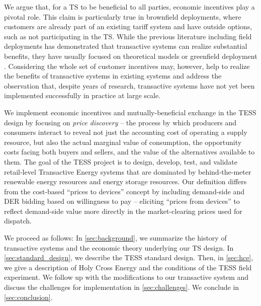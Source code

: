 We argue that, for a TS to be beneficial to all parties, economic incentives play a pivotal role. This claim is particularly true in brownfield deployments, where customers are already part of an existing tariff system and have outside options, such as not participating in the TS. While the previous literature including field deployments has demonstrated that transactive systems can realize substantial benefits, they have usually focused on theoretical models or greenfield deployment \citep[p. 12]{abrishambaf_towards_2019}. Considering the whole set of customer incentives may, however, help to realize the benefits of transactive systems in existing systems and address the observation that, despite years of research, transactive systems have not yet been implemented successfully in practice at large scale.



We implement economic incentives and mutually-beneficial exchange in the TESS design by focusing on \emph{price discovery} -- the process by which producers and consumers interact to reveal not just the accounting cost of operating a supply resource, but also the actual marginal value of consumption, the opportunity costs facing both buyers and sellers, and the value of the alternatives available to them. %
The goal of the TESS project is to design, develop, test, and validate retail-level Transactive Energy systems that are dominated by behind-the-meter renewable energy resources and energy storage resources. Our definition differs from the cost-based ``prices to devices'' concept by including demand-side and DER bidding based on willingness to pay -- eliciting ``prices from devices'' to reflect demand-side value more directly in the market-clearing prices used for dispatch.

We proceed as follows: In \cref{sec:background}, we summarize the history of transactive systems and the economic theory underlying our TS design. In \cref{sec:standard_design}, we describe the TESS standard design. Then, in \cref{sec:hce}, we give a description of Holy Cross Energy and the conditions of the TESS field experiment. We follow up with the modifications to our transactive system and discuss the challenges for implementation in \cref{sec:challenges}. We conclude in \cref{sec:conclusion}.


